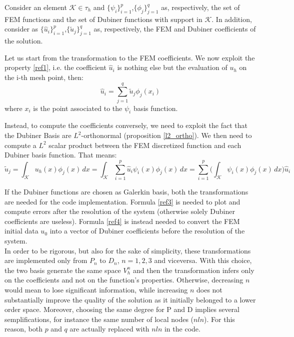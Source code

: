 \documentclass[a4paper,11pt]{article}
\begin{document}
	\noindent Consider an element $\mathcal{K}\in \tau_h$ and $\{\psi_{i}\}_{i=1}^{p}$,$\{\phi_{j}\}_{j=1}^{q}$ as, respectively, the set of FEM functions and the set of Dubiner functions with support in $\mathcal{K}$. In addition, consider as $\{\hat{u}_i\}_{i=1}^p$,$\{\tilde{u}_j\}_{j=1}^q$ as, respectively, the FEM and Dubiner coefficients of the solution. \vspace{5mm}
	
	\noindent Let us start from the transformation to the FEM coefficients. We now exploit the property \ref{ref1}, i.e. the coefficient $\hat{u}_i$ is nothing else but the evaluation of $u_h$ on the i-th mesh point, then: 
	\begin{equation} \label{ref3}
	\hat{u}_i = \sum_{j=1}^q \tilde{u}_j\phi_j(x_i)
	\end{equation}
	where $x_i$ is the point associated to the $\psi_i$ basis function. \vspace{5mm}
	
	\noindent Instead, to compute the coefficients conversely, we need to exploit the fact that the Dubiner Basis are $L^2$-orthonormal (proposition \ref{l2_ortho}). We then need to compute a $L^2$ scalar product between the FEM discretized function and each Dubiner basis function. That means:
	\begin{equation}\label{ref4}
	\tilde{u}_j = \int_\mathcal{K} u_h(x) \phi_j(x) \,dx = \int_{\mathcal{K}} \sum_{i=1}^p \hat{u}_i\psi_i(x) \phi_j(x) \,dx = \sum_{i=1}^p \Big(\int_{\mathcal{K}}\psi_i(x)\phi_j(x)\,dx \Big) \hat{u}_i
	\end{equation}
	
	\vspace{5mm}
	\noindent If the Dubiner functions are chosen as Galerkin basis, both the transformations are needed for the code implementation. Formula \ref{ref3} is needed to plot and compute errors after the resolution of the system (otherwise solely Dubiner coefficients are useless). Formula \ref{ref4} is instead needed to convert the FEM initial data $u_0$ into a vector of Dubiner coefficients before the resolution of the system.\\
	
	\noindent In order to be rigorous, but also for the sake of simplicity, these transformations are implemented only from $P_n$ to $D_n$, $n=1,2,3$ and viceversa. With this choice, the two basis generate the same space $V_h^n$ and then the transformation infers only on the coefficients and not on the function's properties. Otherwise, decreasing $n$ would mean to lose significant information, while increasing $n$ does not substantially improve the quality of the solution as it initially belonged to a lower order space. Moreover, choosing the same degree for P and D implies several semplifications, for instance the same number of local nodes ($nln$). For this reason, both $p$ and $q$ are actually replaced with $nln$ in the code.\\
	
\end{document}

